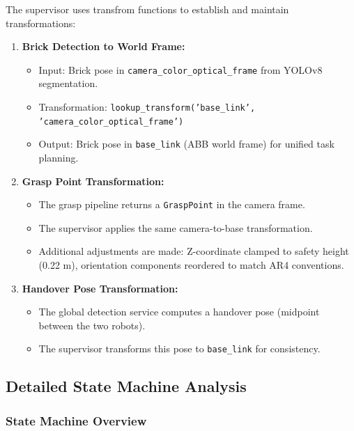 The supervisor uses transfrom functions to establish and maintain transformations:

\begin{enumerate}
    \item \textbf{Brick Detection to World Frame:}
    \begin{itemize}
        \item Input: Brick pose in \texttt{camera\_color\_optical\_frame} from YOLOv8 segmentation.
        \item Transformation: \texttt{lookup\_transform('base\_link', 'camera\_color\_optical\_frame')}
        \item Output: Brick pose in \texttt{base\_link} (ABB world frame) for unified task planning.
    \end{itemize}

    \item \textbf{Grasp Point Transformation:}
    \begin{itemize}
        \item The grasp pipeline returns a \texttt{GraspPoint} in the camera frame.
        \item The supervisor applies the same camera-to-base transformation.
        \item Additional adjustments are made: Z-coordinate clamped to safety height (0.22 m), orientation components reordered to match AR4 conventions.
    \end{itemize}

    \item \textbf{Handover Pose Transformation:}
    \begin{itemize}
        \item The global detection service computes a handover pose (midpoint between the two robots).
        \item The supervisor transforms this pose to \texttt{base\_link} for consistency.
    \end{itemize}
\end{enumerate}
\clearpage

\subsection{Detailed State Machine Analysis}

\subsubsection{State Machine Overview}

